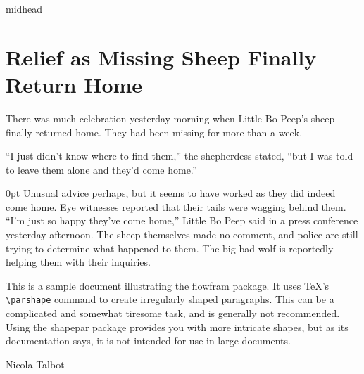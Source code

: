 \documentclass[12pt]{article}
\begin{document}
\begin{staticcontents*}{midhead}
\section{Relief as Missing Sheep Finally Return Home}
\end{staticcontents*}

There was much celebration yesterday morning when Little Bo
Peep's sheep finally returned home. They had been missing
for more than a week.

``I just didn't know where to find them,'' the shepherdess
stated, ``but I was told to leave them alone and they'd come
home.''

0pt \linewidth
0pt \linewidth
0pt \linewidth
0pt \linewidth
Unusual advice perhaps, but it seems to have worked
as they did indeed come home. Eye witnesses reported that their
tails were wagging behind them.
``I'm just so happy they've come home,'' Little Bo Peep said
in a press conference yesterday afternoon.
The sheep themselves made no comment, and police are%
\framebreak{}
still trying to determine what happened to them.
The big bad wolf is reportedly helping them with their inquiries.

\noindent\hrulefill

This is a sample document illustrating the
flowfram package. It uses \TeX's \verb|\parshape| command
to create irregularly shaped paragraphs. This can be a complicated
and somewhat tiresome task, and is generally not recommended.
Using the shapepar package provides you with more intricate
shapes, but as its documentation says, it is not intended
for use in large documents.

\hfill Nicola Talbot
\end{document}
